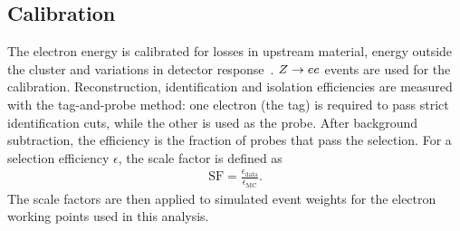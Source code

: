 \subsection{Calibration}

The electron energy is calibrated for losses in upstream material, energy outside the cluster and variations in detector response~\cite{ATLAS2019ElectronPerformance}.
$Z\rightarrow ee$ events are used for the calibration.
Reconstruction, identification and isolation efficiencies are measured with the tag-and-probe method: one electron (the tag) is required to pass strict identification cuts, while the other is used as the probe.
After background subtraction, the efficiency is the fraction of probes that pass the selection.
For a selection efficiency $\epsilon$, the scale factor is defined as
\begin{align}
    \mathrm{SF}=\frac{\epsilon_{\mathrm{data}}}{\epsilon_{\mathrm{MC}}}.
    \label{eq:ch6_efficiency_sf}
\end{align}
The scale factors are then applied to simulated event weights for the electron working points used in this analysis.
